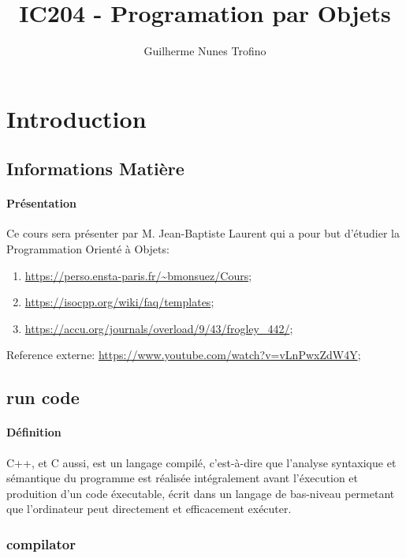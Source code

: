 \documentclass{article}
\title{IC204 - Programation par Objets}
\author{Guilherme Nunes Trofino}
\begin{document}
\maketitle

\newpage\tableofcontents

\section{Introduction}

% 


\subsection{Informations Matière}
\paragraph{Présentation}Ce cours sera présenter par M. Jean-Baptiste Laurent qui a pour but d'étudier la Programmation Orienté à Objets:
\begin{enumerate}[noitemsep]
    \item \url{https://perso.ensta-paris.fr/~bmonsuez/Cours};
    \item \url{https://isocpp.org/wiki/faq/templates};
    \item \url{https://accu.org/journals/overload/9/43/frogley_442/};
\end{enumerate}
Reference externe: \url{https://www.youtube.com/watch?v=vLnPwxZdW4Y};

\subsection{run code}
\paragraph{Définition}C++, et C aussi, est un langage compilé, c'est-à-dire que l'analyse syntaxique et sémantique du programme est réalisée intégralement avant l'éxecution et produition d'un code éxecutable, écrit dans un langage de bas-niveau permetant que l'ordinateur peut directement et efficacement exécuter.\\

\subsubsection{compilator}
\end{document}
